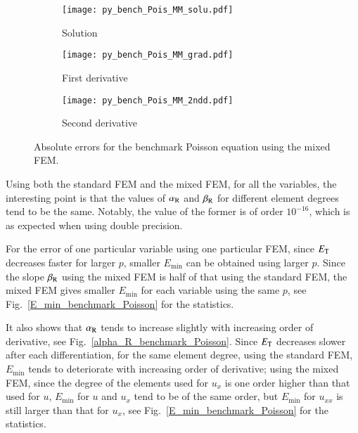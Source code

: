 \documentclass[review,3p]{elsarticle}
\begin{document}
\begin{figure}[!ht]
    \begin{subfigure}{5.5cm}
        \texttt{[image: py\_bench\_Pois\_MM\_solu.pdf]}
        \caption{Solution}
        \label{py_bench_Pois_MM_solu}
    \end{subfigure}
    \hspace{-0.2cm}
    \begin{subfigure}{5.5cm}
        \texttt{[image: py\_bench\_Pois\_MM\_grad.pdf]}
        \caption{First derivative}
        \label{py_bench_Pois_MM_grad}
    \end{subfigure}
    \hspace{-0.2cm}
    \begin{subfigure}{5.5cm}
        \texttt{[image: py\_bench\_Pois\_MM\_2ndd.pdf]}
        \caption{Second derivative}
        \label{py_bench_Pois_MM_2ndd}
    \end{subfigure}
\caption{Absolute errors for the benchmark Poisson equation using the mixed FEM.}
\label{py_bench_Pois_MM}
\end{figure}

Using both the standard FEM and the mixed FEM, for all the variables, the interesting point is that the values of $\alpha_{\rm R}$ and $\beta_{\rm R}$ for different element degrees tend to be the same. Notably, the value of the former is of order $10^{-16}$, which is as expected when using double precision.

For the error of one particular variable using one particular FEM, since $E_{\rm T}$ decreases faster for larger $p$, smaller ${E}_{\text{min}}$ can be obtained using larger $p$. Since the slope $\beta_{\rm R}$ using the mixed FEM is half of that using the standard FEM\cite{kahan2013floating}, the mixed FEM gives smaller ${E}_{\text{min}}$ for each variable using the same $p$, see Fig.~\ref{E_min_benchmark_Poisson} for the statistics.

It also shows that $\alpha_{\rm R}$ tends to increase slightly with increasing order of derivative, see Fig.~\ref{alpha_R_benchmark_Poisson}. Since $E_{\rm T}$ decreases slower after each differentiation, for the same element degree, using the standard FEM, ${E}_{\text{min}}$ tends to deteriorate with increasing order of derivative; using the mixed FEM, since the degree of the elements used for $u_{x}$ is one order higher than that used for $u$, ${E}_{\text{min}}$ for $u$ and $u_{x}$ tend to be of the same order, but ${E}_{\text{min}}$ for $u_{xx}$ is still larger than that for $u_{x}$, see Fig.~\ref{E_min_benchmark_Poisson} for the statistics. 
\end{document}
